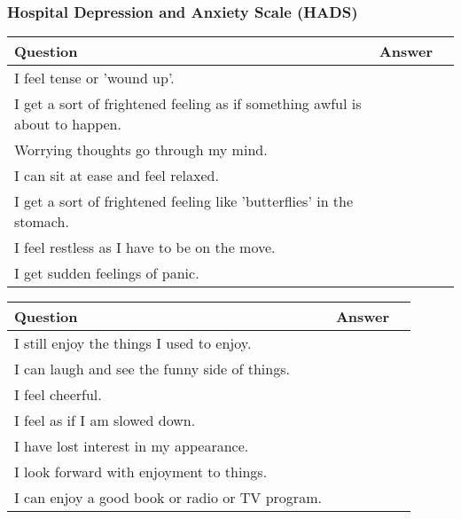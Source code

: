 \subsubsection{Hospital Depression and Anxiety Scale (HADS)}
\begin{table}[H]
    \centering
    \renewcommand{\arraystretch}{1.2}
    \begin{tabularx}{\textwidth}{|l|X|l|}
        \hline
        \textbf{Question} & \textbf{Answer} \\ \hline
        I feel tense or 'wound up'. &  \\ \hline
        I get a sort of frightened feeling as if something awful is about to happen. &  \\ \hline
        Worrying thoughts go through my mind. &  \\ \hline
        I can sit at ease and feel relaxed. &  \\ \hline
        I get a sort of frightened feeling like 'butterflies' in the stomach. &  \\ \hline
        I feel restless as I have to be on the move. &  \\ \hline
        I get sudden feelings of panic. &  \\ \hline
    \end{tabularx}
\end{table}
\begin{table}[H]
    \centering
    \renewcommand{\arraystretch}{1.2}
    \begin{tabularx}{\textwidth}{|l|X|l|}
        \hline
        \textbf{Question} & \textbf{Answer} \\ \hline
        I still enjoy the things I used to enjoy. &  \\ \hline
        I can laugh and see the funny side of things. &  \\ \hline
        I feel cheerful. &  \\ \hline
        I feel as if I am slowed down. &  \\ \hline
        I have lost interest in my appearance. &  \\ \hline
        I look forward with enjoyment to things. &  \\ \hline
        I can enjoy a good book or radio or TV program. &  \\ \hline
    \end{tabularx}
\end{table}

